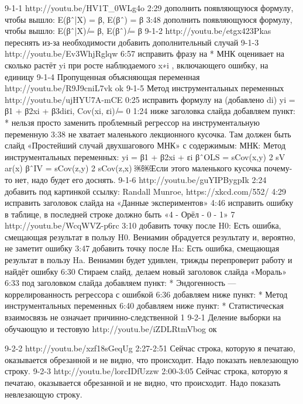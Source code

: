 \documentclass[12pt,a4paper]{article}
\begin{document}
9-1-1 http://youtu.be/HV1T_0WLg4o
2:29 дополнить появляющуюся формулу, чтобы вышло:
E(βˆ|X) = β, E(βˆ) = β
3:48 дополнить появляющуюся формулу, чтобы вышло:
E(βˆ|X) ̸= β, E(βˆ) ̸= β
9-1-2 http://youtu.be/etgx423Pkas
переснять из-за необходимости добавить дополнительный случай
9-1-3 http://youtu.be/Ev3WhjRglqw
6:57 исправить фразу на
* МНК оценивает на сколько растёт yi при росте наблюдаемого x∗i , включающего ошибку, на
единицу
9-1-4 Пропущенная объясняющая переменная http://youtu.be/R9J9cniL7vk ok
9-1-5 Метод инструментальных переменных http://youtu.be/ujHYU7A-mCE
0:25 исправить формулу на (добавлено di)
yi = β1 + β2xi + β3diεi, Cov(xi, εi) ̸= 0
1:24 ниже заголовка слайда добавляем пункт:
* нельзя просто заменить проблемный регрессор на инструментальную переменную
3:38 не хватает маленького лекционного кусочка. Там должен быть слайд «Простейший случай
двухшагового МНК» с содержимым:
МНК:
Метод инструментальных переменных:
yi = β1 + β2xi + εi βˆOLS = sCov(x,y)
2 sV ar(x) βˆIV = sCov(z,y)
2 sCov(z,x)
￼￼Если этого маленького кусочка почему-то нет, надо будет его доснять. 9-1-6 http://youtu.be/guYIPBygpIk
2:24 добавить под картинкой ссылку:
Randall Munroe, https://xkcd.com/552/
4:29 исправить заголовок слайда на «Данные экспериментов»
4:46 исправить ошибку в таблице, в последней строке должно быть «4 - Орёл - 0 - 1»
7 http://youtu.be/WcqWVZ-p6rc
3:10 добавить точку после H0:
Есть ошибка, смещающая результат в пользу H0. Вениамин обрадуется результату и, вероятно,
не заметит ошибку
3:47 добавить точку после Ha:
Есть ошибка, смещающая результат в пользу Ha. Вениамин будет удивлен, трижды перепроверит
работу и найдёт ошибку
6:30 Стираем слайд, делаем новый заголовок слайда «Мораль» 6:33 под заголовком слайда добавляем пункт:
* Эндогенность — коррелированность регрессора с ошибкой
6:36 добавляем ниже пункт:
* Метод инструментальных переменных
6:40 добавляем ниже пункт:
* Статистическая взаимосвязь не означает причинно-следственной
1
9-2-1 Деление выборки на обучающую и тестовую
http://youtu.be/iZDLRtmVbog ок

9-2-2 http://youtu.be/xzf18sGeqUg
2:27-2:51 Сейчас строка, которую я печатаю, оказывается обрезанной и не видно, что происходит.
Надо показать невлезающую строку.
9-2-3 http://youtu.be/lorcIDfUzzw
2:00-3:05 Сейчас строка, которую я печатаю, оказывается обрезанной и не видно, что происходит.
Надо показать невлезающую строку.
\end{document}
